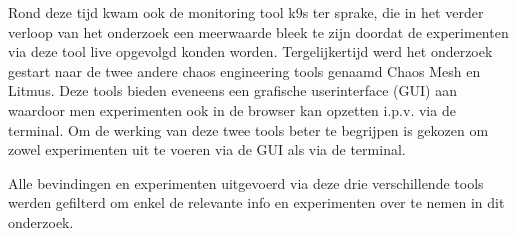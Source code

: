 Rond deze tijd kwam ook de monitoring tool k9s ter sprake, die in het verder verloop van het onderzoek een meerwaarde bleek te zijn doordat de experimenten via deze tool live opgevolgd konden worden.
Tergelijkertijd werd het onderzoek gestart naar de twee andere chaos engineering tools genaamd Chaos Mesh en Litmus. Deze tools bieden eveneens een grafische userinterface (GUI) aan waardoor men experimenten ook in de browser kan opzetten i.p.v. via de terminal. Om de werking van deze twee tools beter te begrijpen is gekozen om zowel experimenten uit te voeren via de GUI als via de terminal.

Alle bevindingen en experimenten uitgevoerd via deze drie verschillende tools werden gefilterd om enkel de relevante info en experimenten over te nemen in dit onderzoek.  
